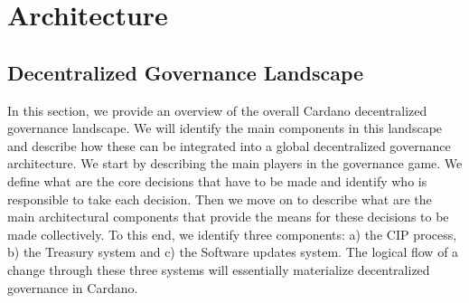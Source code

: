 \section{Architecture} \label{architecture}

\subsection{Decentralized Governance Landscape} 
\label{decentralized_governance_landscape}
%

In this section, we provide an overview of the overall Cardano 
decentralized governance landscape. We will identify the main components in 
this landscape and describe how these can be integrated into a global 
decentralized governance architecture.  We start by describing the main players 
in the governance game. We define what are the core decisions that have to be 
made and identify who is responsible to take each decision.  Then we move on to 
describe what are the main architectural components that provide the means for 
these decisions to be made collectively. To this end, we identify three 
components: a) the CIP process, b) the Treasury system and c) the Software 
updates system. The logical flow of a change through these three systems will 
essentially materialize decentralized governance in Cardano.


